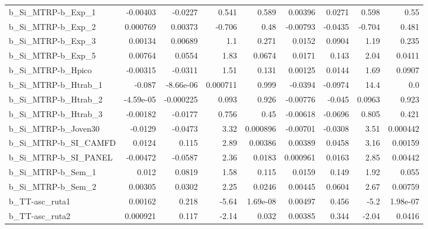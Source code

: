 \begin{tabular}{lrrrrrrrr}
b\_Si\_MTRP-b\_Exp\_1          &    -0.00403 &      -0.0227 &     0.541 &    0.589 &    0.00396 &      0.0271 &        0.598 &          0.55 \\
b\_Si\_MTRP-b\_Exp\_2          &    0.000769 &      0.00373 &    -0.706 &     0.48 &   -0.00793 &     -0.0435 &       -0.704 &         0.481 \\
b\_Si\_MTRP-b\_Exp\_3          &     0.00134 &      0.00689 &       1.1 &    0.271 &     0.0152 &      0.0904 &         1.19 &         0.235 \\
b\_Si\_MTRP-b\_Exp\_5          &     0.00764 &       0.0554 &      1.83 &   0.0674 &     0.0171 &       0.143 &         2.04 &        0.0411 \\
b\_Si\_MTRP-b\_Hpico          &    -0.00315 &      -0.0311 &      1.51 &    0.131 &    0.00125 &      0.0144 &         1.69 &        0.0907 \\
b\_Si\_MTRP-b\_Htrab\_1        &      -0.087 &    -8.66e-06 &  0.000711 &    0.999 &    -0.0394 &     -0.0974 &         14.4 &           0.0 \\
b\_Si\_MTRP-b\_Htrab\_2        &   -4.59e-05 &    -0.000225 &     0.093 &    0.926 &   -0.00776 &      -0.045 &       0.0963 &         0.923 \\
b\_Si\_MTRP-b\_Htrab\_3        &    -0.00182 &      -0.0177 &     0.756 &     0.45 &   -0.00618 &     -0.0696 &        0.805 &         0.421 \\
b\_Si\_MTRP-b\_Joven30        &     -0.0129 &      -0.0473 &      3.32 & 0.000896 &   -0.00701 &     -0.0308 &         3.51 &      0.000442 \\
b\_Si\_MTRP-b\_SI\_CAMFD       &      0.0124 &        0.115 &      2.89 &  0.00386 &    0.00389 &      0.0458 &         3.16 &       0.00159 \\
b\_Si\_MTRP-b\_SI\_PANEL       &    -0.00472 &      -0.0587 &      2.36 &   0.0183 &   0.000961 &      0.0163 &         2.85 &       0.00442 \\
b\_Si\_MTRP-b\_Sem\_1          &       0.012 &       0.0819 &      1.58 &    0.115 &     0.0159 &       0.149 &         1.92 &         0.055 \\
b\_Si\_MTRP-b\_Sem\_2          &     0.00305 &       0.0302 &      2.25 &   0.0246 &    0.00445 &      0.0604 &         2.67 &       0.00759 \\
b\_TT-asc\_ruta1             &     0.00162 &        0.218 &     -5.64 & 1.69e-08 &    0.00497 &       0.456 &         -5.2 &      1.98e-07 \\
b\_TT-asc\_ruta2             &    0.000921 &        0.117 &     -2.14 &    0.032 &    0.00385 &       0.344 &        -2.04 &        0.0416 \\

\end{tabular}
